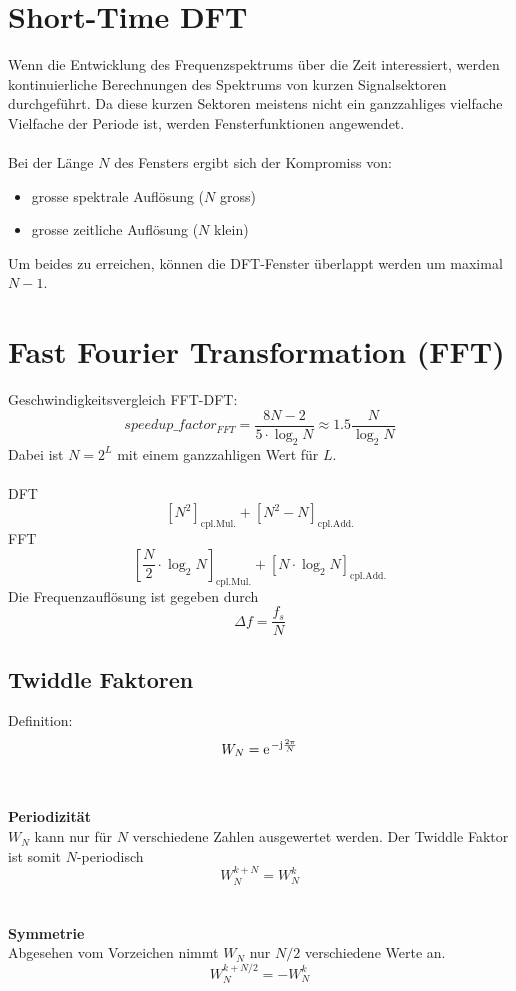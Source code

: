 \section{Short-Time DFT}
Wenn die Entwicklung des Frequenzspektrums über die Zeit interessiert, werden
kontinuierliche Berechnungen des Spektrums von kurzen Signalsektoren 
durchgeführt. Da diese kurzen Sektoren meistens nicht ein ganzzahliges
vielfache Vielfache der Periode ist, werden Fensterfunktionen angewendet.\\
\\
Bei der Länge $N$ des Fensters ergibt sich der Kompromiss von:
\begin{itemize}
	\item grosse spektrale Auflösung ($N$ gross)
	\item grosse zeitliche Auflösung ($N$ klein)
\end{itemize}

Um beides zu erreichen, können die DFT-Fenster überlappt werden um maximal
$N-1$.

\section{Fast Fourier Transformation (FFT)}
Geschwindigkeitsvergleich FFT-DFT:
\[ speedup\_factor_{FFT} = \frac{8N-2}{5\cdot \log_2N} \approx 1.5 	
	\frac{N}{\log_2N} \]
Dabei ist $N = 2^L$ mit einem ganzzahligen Wert für $L$.\\
\\
DFT
\[ \left[N^2\right]_\textrm{cpl.Mul.} + \left[N^2-N\right]_\textrm{cpl.Add.} \]
FFT
\[ \left[\frac{N}{2}\cdot\log_2N\right]_\textrm{cpl.Mul.} + 
	\left[N\cdot\log_2N\right]_\textrm{cpl.Add.} \]
Die Frequenzauflösung ist gegeben durch
\[ \Delta f = \frac{f_s}{N} \]
	
\subsection{Twiddle Faktoren}
Definition:
\[ W_N = \e^{-\im\frac{2\pi}{N}} \]\\
\\
\textbf{Periodizität}\\
$W_N$ kann nur für $N$ verschiedene Zahlen ausgewertet werden. Der Twiddle
Faktor ist somit $N$-periodisch
\[ W_N^{k+N} = W_N^k \]\\
\\
\textbf{Symmetrie}\\
Abgesehen vom Vorzeichen nimmt $W_N$ nur $N/2$ verschiedene Werte an.
\[ W_N^{k+N/2} = -W_N^k \]

